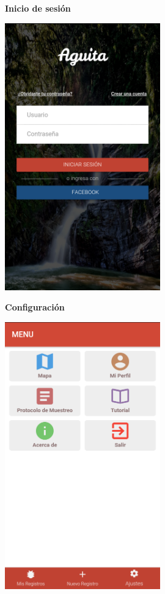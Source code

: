 				\begin{figure}[H]
					\hspace*{1cm}\raggedright\large\textbf{Inicio de sesión}\par\medskip
					\centering
						\includegraphics[width=0.6\textwidth]{Screenshots/login.png}
				\end{figure}

				\begin{figure}[H]
					\hspace*{1cm}\raggedright\large\textbf{Configuración}\par\medskip
					\centering
						\includegraphics[width=0.6\textwidth]{Screenshots/configuracion.png}
				\end{figure}

